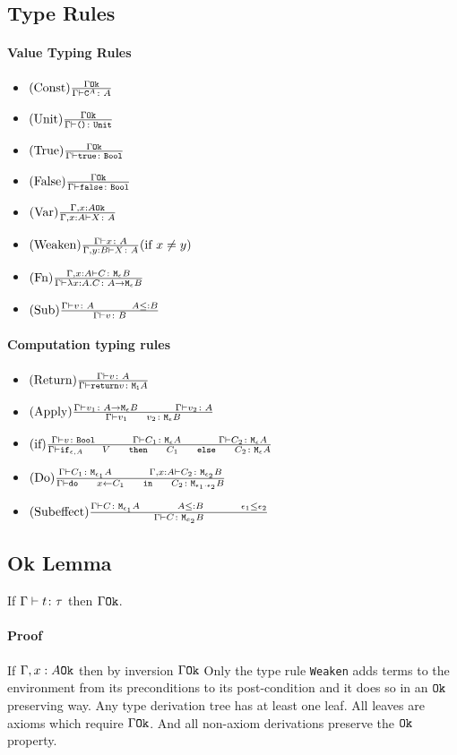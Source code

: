 \documentclass{report}
\begin{document}
    \subsection{Type Rules}
    \paragraph{Value Typing Rules}
    \begin{itemize}
        \item $(\text{Const}) \frac{\Gamma \texttt{Ok}}{\Gamma \vdash \texttt{C}^{A} \colon A}$
        \item $(\text{Unit}) \frac{\Gamma \texttt{Ok}}{\Gamma \vdash \texttt{()} \colon \texttt{Unit}}$
        \item $(\text{True}) \frac{\Gamma \texttt{Ok}}{\Gamma \vdash \texttt{true} \colon \texttt{Bool}}$
        \item $(\text{False}) \frac{\Gamma \texttt{Ok}}{\Gamma \vdash \texttt{false} \colon \texttt{Bool}}$
        \item $(\text{Var}) \frac{\Gamma, x: A \texttt{Ok}}{\Gamma, x: A \vdash X \colon A}$
        \item $(\text{Weaken}) \frac{\Gamma \vdash x \colon A}{\Gamma, y: B \vdash X \colon A}(\text{if } x \neq y)$
        \item $(\text{Fn}) \frac{\Gamma, x: A \vdash C \colon \texttt{M}_{\epsilon}{B}}{\Gamma \vdash \lambda x : A. C \colon A \rightarrow \texttt{M}_{\epsilon}{B}}$
        \item $\treerule{Sub}{\typerelation{\G}{v}{A}\s\s A \subtype B}{\typerelation{\G}{v}{B}}$
    \end{itemize}
    \paragraph{Computation typing rules}
    \begin{itemize}
        \item $(\text{Return}) \frac{\Gamma \vdash v \colon A}{\Gamma \vdash \texttt{return} v \colon \texttt{M}_{\texttt{1}}{A}}$
        \item $\treerule{Apply}{\typerelation{\G}{v_1}{\lamtype{A}{\e}{B}}\s\s\typerelation{\G}{v_2}{A}}{\typerelation{\G}{\apply{v_1}{v_2}}{\meb}}$
        \item $\treerule{if}{\typerelation{\G}{v}{\B} \s\s \typerelation{\G}{C_1}{\mea}\s\s\typerelation{\G}{C_2}{\mea}}{\typerelation{\G}{\ifthenelse{\e}{A}{V}{C_1}{C_2}}{\mea}}$
        \item $\treerule{Do}{\typerelation{\G}{C_1}{\M{\e_1}{A}} \s\s \typerelation{\gax}{C_2}{\M{\e_2}{B}}}{\typerelation{\G}{\doin{x}{C_1}{C_2}}{\M{\e_1 \dot \e_2}{B}}}$
        \item $\treerule{Subeffect}{\typerelation{\G}{C}{\M{\e_1}{A}}\s\s A \subtype B \s\s \e_1 \subeffect \e_2}{\typerelation{\G}{C}{\M{e_2}{B}}}$
    \end{itemize}

    \subsection{Ok Lemma}
    If $\Gamma \vdash t \colon \tau$ then $\Gamma \texttt{Ok}$.
    \paragraph{Proof}
    If $\Gamma, x: A \texttt{Ok}$ then by inversion $\Gamma \texttt{Ok}$
    Only the type rule \texttt{Weaken} adds terms to the environment from its preconditions to its post-condition and it does so in an $\texttt{Ok}$ preserving way. Any type derivation tree has at least one leaf. All leaves are axioms which require $\Gamma \texttt{Ok}$. And all non-axiom derivations preserve the $\texttt{Ok}$ property.
\end{document}
